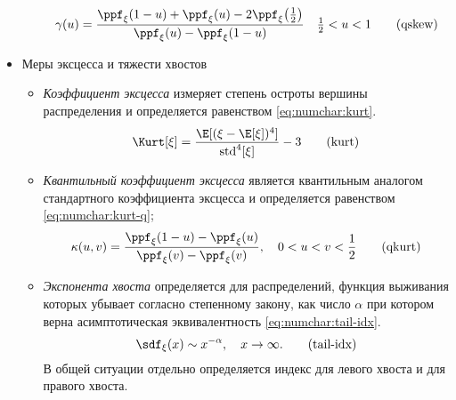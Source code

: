 \begin{itemize}
\begin{itemize}[noitemsep, parsep=0pt,topsep=0pt]
        \begin{equation}
            \label{eq:numchar:skew-grunn} 
            \gamma(u) =\frac{\ppf_\xi(1 - u) + \ppf_\xi(u) - 2 \ppf_\xi\mleft(\frac{1}{2}\mright)}{\ppf_\xi(u) - \ppf_\xi(1 - u)} \quad \tfrac{1}{2} <u<1 \tag{qskew}
        \end{equation}
    \end{itemize}
    \item Меры эксцесса и тяжести хвостов
    \begin{itemize}[noitemsep, parsep=0pt,topsep=0pt]
        \item \emph{Коэффициент эксцесса} измеряет степень  остроты вершины распределения и определяется равенством \eqref{eq:numchar:kurt}.
        \begin{equation}
            \label{eq:numchar:kurt}
            \Kurt[\xi] = \frac{\E[(\xi - \E[\xi])^4]}{\std^4[\xi]} - 3 \tag{kurt}
        \end{equation}
    
        \item \emph{Квантильный коэффициент эксцесса} является квантильным аналогом стандартного коэффициента эксцесса \cite{ruppert1987kurtosis} и определяется равенством \eqref{eq:numchar:kurt-q};
        \begin{equation}
            \label{eq:numchar:kurt-q} 
            \kappa(u, v) = \frac{\ppf_\xi(1-u) - \ppf_\xi(u)}{\ppf_\xi(v) - \ppf_\xi(v)}, \quad 0<u<v<\frac{1}{2} \tag{qkurt}
        \end{equation}
    
        \item \emph{Экспонента хвоста} определяется для распределений, функция выживания которых убывает согласно степенному закону, как число $\alpha$ при котором верна асимптотическая эквивалентность \eqref{eq:numchar:tail-idx}.
        \begin{equation}
            \label{eq:numchar:tail-idx} 
            \sdf_{\xi}(x) \sim x^{-\alpha}, \quad x \to\infty. \tag{tail-idx}
        \end{equation}
        В общей ситуации отдельно определяется индекс для левого хвоста и для правого хвоста.
    \end{itemize}
\end{itemize}


